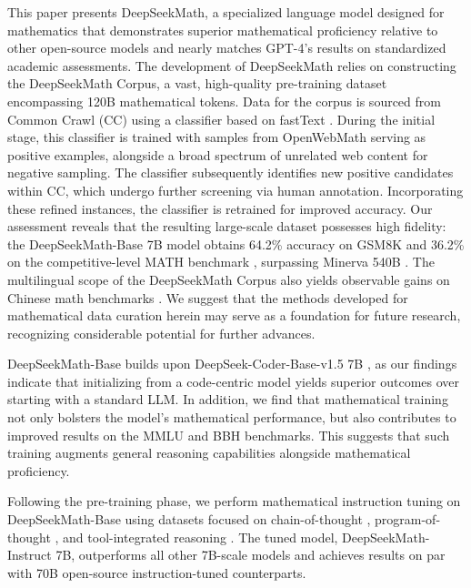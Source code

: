 This paper presents DeepSeekMath, a specialized language model designed for mathematics that demonstrates superior mathematical proficiency relative to other open-source models and nearly matches GPT-4’s results on standardized academic assessments. The development of DeepSeekMath relies on constructing the DeepSeekMath Corpus, a vast, high-quality pre-training dataset encompassing 120B mathematical tokens. Data for the corpus is sourced from Common Crawl (CC) using a classifier based on fastText \citep{joulin2016fasttext}. During the initial stage, this classifier is trained with samples from OpenWebMath \citep{openwebmath} serving as positive examples, alongside a broad spectrum of unrelated web content for negative sampling. The classifier subsequently identifies new positive candidates within CC, which undergo further screening via human annotation. Incorporating these refined instances, the classifier is retrained for improved accuracy. Our assessment reveals that the resulting large-scale dataset possesses high fidelity: the DeepSeekMath-Base 7B model obtains 64.2\% accuracy on GSM8K \citep{gsm8k} and 36.2\% on the competitive-level MATH benchmark \citep{MATH}, surpassing Minerva 540B \citep{minerva}. The multilingual scope of the DeepSeekMath Corpus also yields observable gains on Chinese math benchmarks \citep{wei2023cmath,agieval}. We suggest that the methods developed for mathematical data curation herein may serve as a foundation for future research, recognizing considerable potential for further advances.

DeepSeekMath-Base builds upon DeepSeek-Coder-Base-v1.5 7B \citep{deepseek-coder}, as our findings indicate that initializing from a code-centric model yields superior outcomes over starting with a standard LLM. In addition, we find that mathematical training not only bolsters the model's mathematical performance, but also contributes to improved results on the MMLU \citep{mmlu} and BBH \citep{bbh} benchmarks. This suggests that such training augments general reasoning capabilities alongside mathematical proficiency.

Following the pre-training phase, we perform mathematical instruction tuning on DeepSeekMath-Base using datasets focused on chain-of-thought \citep{cot}, program-of-thought \citep{pot,pal}, and tool-integrated reasoning \citep{tora}. The tuned model, DeepSeekMath-Instruct 7B, outperforms all other 7B-scale models and achieves results on par with 70B open-source instruction-tuned counterparts.

